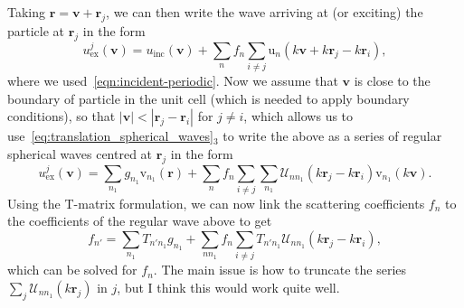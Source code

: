 \documentclass[ 12pt, a4paper]{article}
\renewcommand{\vec}[1]{\boldsymbol{#1}}
\begin{document}
Taking $\vec r = \vec v + \vec r_j$, we can then write the wave arriving at (or exciting) the particle at $\vec r_j$ in the form
\[
u^{j}_\mathrm{ex}(\vec v) = u_\mathrm{inc}(\vec v) + \sum_n f_n \sum_{i \not = j} \mathrm u_n(k \vec v + k \vec r_j - k \vec r_i),
\]
where we used~\eqref{eqn:incident-periodic}. Now we assume that $\vec v$ is close to the boundary of particle in the unit cell (which is needed to apply boundary conditions), so that $|\vec v | < |\vec r_j -  \vec r_i|$ for $j \not = i$, which allows us to use~\eqref{eq:translation_spherical_waves}${}_3$ to write the above as a series of regular spherical waves centred at $\vec r_j$ in the form
\[
u^{j}_\mathrm{ex}(\vec v) = \sum_{n_1} g_{n_1} \mathrm v_{n_1}(\vec r) + \sum_n f_n \sum_{i \not = j} \sum_{n_1} \mathcal U_{n n_1}( k \vec r_j - k \vec r_i) \mathrm v_{n_1}(k \vec v).
\]
Using the T-matrix formulation, we can now link the scattering coefficients $f_n$ to the coefficients of the regular wave above to get
\begin{equation}
  f_{n'} =  \sum_{n_1} T_{n' n_1} g_{n_1} + \sum_{n n_1} f_n \sum_{i \not = j} T_{n' n_1} \mathcal U_{n n_1}( k \vec r_j - k \vec r_i),
\end{equation}
which can be solved for $f_n$. The main issue is how to truncate the series $ \sum_j \mathcal U_{n n_1}( k \vec r_j)$ in $j$, but I think this would work quite well.

\printbibliography
\end{document}
